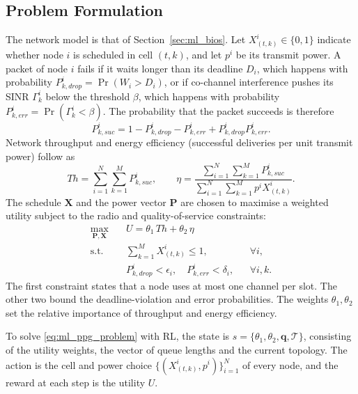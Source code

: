 \subsection{Problem Formulation}
The network model is that of Section~\ref{sec:ml_bios}. Let $X^{i}_{(t,k)}\in\{0,1\}$ indicate whether node $i$ is scheduled in cell $(t,k)$, and let $p^{i}$ be its transmit power. A packet of node $i$ fails if it waits longer than its deadline $D_i$, which happens with probability $P^{i}_{k,drop}=\Pr(W_i>D_i)$, or if co-channel interference pushes its SINR $\Gamma^{i}_{k}$ below the threshold $\beta$, which happens with probability $P^{i}_{k,err}=\Pr(\Gamma^{i}_{k}<\beta)$. The probability that the packet succeeds is therefore
\begin{equation}
  P^{i}_{k,suc}=1-P^{i}_{k,drop}-P^{i}_{k,err}+P^{i}_{k,drop}P^{i}_{k,err}.
\end{equation}
Network throughput and energy efficiency (successful deliveries per unit transmit power) follow as
\begin{equation}
  Th=\sum_{i=1}^{N}\sum_{k=1}^{M}P^{i}_{k,suc}, \qquad
  \eta=\frac{\sum_{i=1}^{N}\sum_{k=1}^{M}P^{i}_{k,suc}}{\sum_{i=1}^{N}\sum_{k=1}^{M}p^{i}X^{i}_{(t,k)}}.
\end{equation}
The schedule $\mathbf{X}$ and the power vector $\mathbf{P}$ are chosen to maximise a weighted utility subject to the radio and quality-of-service constraints:
\begin{equation}
\begin{aligned}
  \max_{\mathbf{P},\mathbf{X}}\quad & U=\theta_1\,Th+\theta_2\,\eta \\
  \text{s.t.}\quad & \textstyle\sum_{k=1}^{M}X^{i}_{(t,k)}\le 1, && \forall i, \\
  & P^{i}_{k,drop}<\epsilon_i,\quad P^{i}_{k,err}<\delta_i, && \forall i,k.
\end{aligned}
\label{eq:ml_ppg_problem}
\end{equation}
The first constraint states that a node uses at most one channel per slot. The other two bound the deadline-violation and error probabilities. The weights $\theta_1,\theta_2$ set the relative importance of throughput and energy efficiency.

To solve \eqref{eq:ml_ppg_problem} with RL, the state is $s=\{\theta_1,\theta_2,\mathbf{q},\mathcal{T}\}$, consisting of the utility weights, the vector of queue lengths and the current topology. The action is the cell and power choice $\{(X^{i}_{(t,k)},p^{i})\}_{i=1}^{N}$ of every node, and the reward at each step is the utility $U$.

